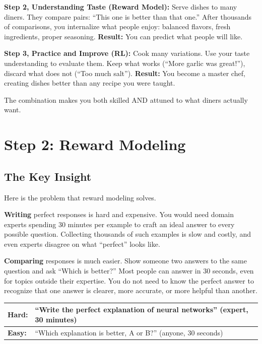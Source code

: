 \begin{chapterenv}
\begin{infobox}
\textbf{Step 2, Understanding Taste (Reward Model):} Serve dishes to many diners. They compare pairs: ``This one is better than that one.'' After thousands of comparisons, you internalize what people enjoy: balanced flavors, fresh ingredients, proper seasoning. \textbf{Result:} You can predict what people will like.

\textbf{Step 3, Practice and Improve (RL):} Cook many variations. Use your taste understanding to evaluate them. Keep what works (``More garlic was great!''), discard what does not (``Too much salt''). \textbf{Result:} You become a master chef, creating dishes better than any recipe you were taught.

The combination makes you both skilled AND attuned to what diners actually want.
\end{infobox}

\section{Step 2: Reward Modeling}

\subsection{The Key Insight}

Here is the problem that reward modeling solves.

\textbf{Writing} perfect responses is hard and expensive. You would need domain experts spending 30 minutes per example to craft an ideal answer to every possible question. Collecting thousands of such examples is slow and costly, and even experts disagree on what ``perfect'' looks like.

\textbf{Comparing} responses is much easier. Show someone two answers to the same question and ask ``Which is better?'' Most people can answer in 30 seconds, even for topics outside their expertise. You do not need to know the perfect answer to recognize that one answer is clearer, more accurate, or more helpful than another.

\begin{center}
\begin{tabular}{p{}p{}}
\toprule
\textbf{Hard:} & ``Write the perfect explanation of neural networks'' (expert, 30 minutes) \\
\midrule
\textbf{Easy:} & ``Which explanation is better, A or B?'' (anyone, 30 seconds) \\
\bottomrule
\end{tabular}
\end{center}


\end{chapterenv}
